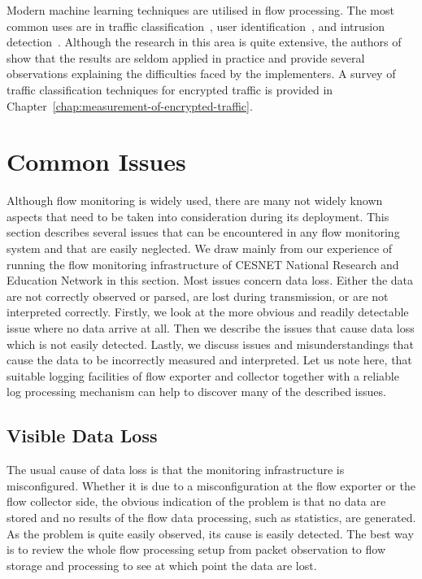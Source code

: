 Modern machine learning techniques are utilised in flow processing. The most common uses are in traffic classification~\cite{Velan-2015-Survey}, user identification~\cite{Verde-2014-No}, and intrusion detection~\cite{Tsai-2009-Intrusion}. Although the research in this area is quite extensive, the authors of~\cite{Sommer-2010-Outside} show that the results are seldom applied in practice and provide several observations explaining the difficulties faced by the implementers. A survey of traffic classification techniques for encrypted traffic is provided in Chapter~\ref{chap:measurement-of-encrypted-traffic}.


\section{Common Issues}\label{sec:common-issues}

Although flow monitoring is widely used, there are many not widely known aspects that need to be taken into consideration during its deployment. This section describes several issues that can be encountered in any flow monitoring system and that are easily neglected. We draw mainly from our experience of running the flow monitoring infrastructure of CESNET National Research and Education Network in this section. Most issues concern data loss. Either the data are not correctly observed or parsed, are lost during transmission, or are not interpreted correctly. Firstly, we look at the more obvious and readily detectable issue where no data arrive at all. Then we describe the issues that cause data loss which is not easily detected. Lastly, we discuss issues and misunderstandings that cause the data to be incorrectly measured and interpreted. Let us note here, that suitable logging facilities of flow exporter and collector together with a reliable log processing mechanism can help to discover many of the described issues.

\subsection{Visible Data Loss}

The usual cause of data loss is that the monitoring infrastructure is misconfigured. Whether it is due to a misconfiguration at the flow exporter or the flow collector side, the obvious indication of the problem is that no data are stored and no results of the flow data processing, such as statistics, are generated. As the problem is quite easily observed, its cause is easily detected. The best way is to review the whole flow processing setup from packet observation to flow storage and processing to see at which point the data are lost.


